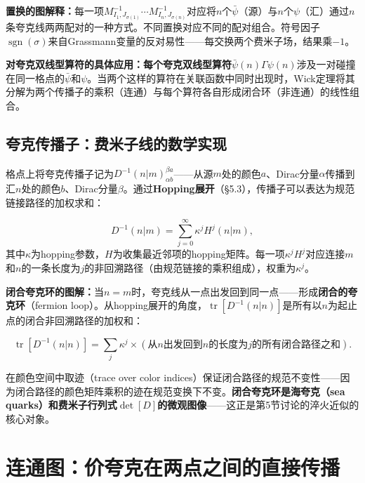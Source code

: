 \documentclass[12pt,a4paper]{ctexart}
\theoremstyle{definition}
\begin{document}
\textbf{置换的图解释：}每一项$M^{-1}_{I_1,J_{\sigma(1)}}\cdots M^{-1}_{I_n,J_{\sigma(n)}}$对应将$n$个$\bar\psi$（源）与$n$个$\psi$（汇）通过$n$条夸克线两两配对的一种方式。不同置换对应不同的配对组合。符号因子$\operatorname{sgn}(\sigma)$来自Grassmann变量的反对易性——每交换两个费米子场，结果乘$-1$。

\textbf{对夸克双线型算符的具体应用：}\textbf{每个夸克双线型算符}$\bar\psi(n)\Gamma\psi(n)$涉及一对碰撞在同一格点的$\bar\psi$和$\psi$。当两个这样的算符在关联函数中同时出现时，Wick定理将其分解为两个传播子的乘积（连通）与每个算符各自形成闭合环（非连通）的线性组合。

\subsection{夸克传播子：费米子线的数学实现}

格点上将夸克传播子记为$D^{-1}(n|m)^{\beta a}_{\alpha b}$——从源$m$处的颜色$a$、Dirac分量$\alpha$传播到汇$n$处的颜色$b$、Dirac分量$\beta$。通过\textbf{Hopping展开}（\S 5.3），传播子可以表达为规范链接路径的加权求和：

\begin{equation}
D^{-1}(n|m) = \sum_{j=0}^\infty \kappa^j H^j(n|m),
\label{eq:hopping_expansion_prop}
\end{equation}
其中$\kappa$为hopping参数，$H$为收集最近邻项的hopping矩阵。每一项$\kappa^j H^j$对应连接$m$和$n$的一条长度为$j$的非回溯路径（由规范链接的乘积组成），权重为$\kappa^j$。

\textbf{闭合夸克环的图解：}当$n=m$时，夸克线从一点出发回到同一点——形成\textbf{闭合的夸克环}（fermion loop）。从hopping展开的角度，$\operatorname{tr}[D^{-1}(n|n)]$是所有以$n$为起止点的闭合非回溯路径的加权和：

\begin{equation}
\operatorname{tr}[D^{-1}(n|n)] = \sum_{j} \kappa^j \times (\text{从}n\text{出发回到}n\text{的长度为}j\text{的所有闭合路径之和}).
\label{eq:closed_loop_trace}
\end{equation}

在颜色空间中取迹（trace over color indices）保证闭合路径的规范不变性——因为闭合路径的颜色矩阵乘积的迹在规范变换下不变。\textbf{闭合夸克环是海夸克（sea quarks）和费米子行列式$\det[D]$的微观图像}——这正是第5节讨论的淬火近似的核心对象。

\section{连通图：价夸克在两点之间的直接传播}
\end{document}
